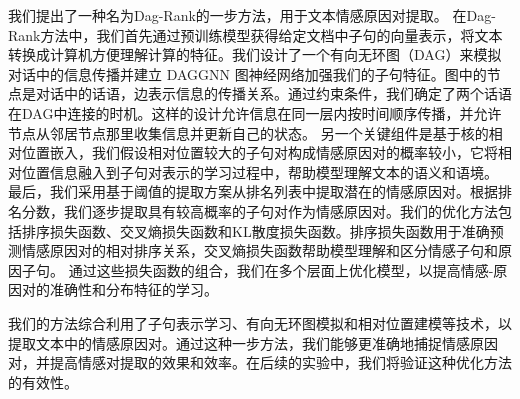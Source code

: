 我们提出了一种名为Dag-Rank的一步方法，用于文本情感原因对提取。
在Dag-Rank方法中，我们首先通过预训练模型获得给定文档中子句的向量表示，将文本转换成计算机方便理解计算的特征。我们设计了一个有向无环图（DAG）来模拟对话中的信息传播并建立 DAGGNN 图神经网络加强我们的子句特征。图中的节点是对话中的话语，边表示信息的传播关系。通过约束条件，我们确定了两个话语在DAG中连接的时机。这样的设计允许信息在同一层内按时间顺序传播，并允许节点从邻居节点那里收集信息并更新自己的状态。
另一个关键组件是基于核的相对位置嵌入，我们假设相对位置较大的子句对构成情感原因对的概率较小，它将相对位置信息融入到子句对表示的学习过程中，帮助模型理解文本的语义和语境。
最后，我们采用基于阈值的提取方案从排名列表中提取潜在的情感原因对。根据排名分数，我们逐步提取具有较高概率的子句对作为情感原因对。我们的优化方法包括排序损失函数、交叉熵损失函数和KL散度损失函数。排序损失函数用于准确预测情感原因对的相对排序关系，交叉熵损失函数帮助模型理解和区分情感子句和原因子句。
通过这些损失函数的组合，我们在多个层面上优化模型，以提高情感-原因对的准确性和分布特征的学习。

我们的方法综合利用了子句表示学习、有向无环图模拟和相对位置建模等技术，以提取文本中的情感原因对。通过这种一步方法，我们能够更准确地捕捉情感原因对，并提高情感对提取的效果和效率。在后续的实验中，我们将验证这种优化方法的有效性。